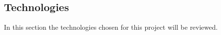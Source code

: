 \subsection{Technologies}

In this section the technologies chosen for this project will be reviewed.




